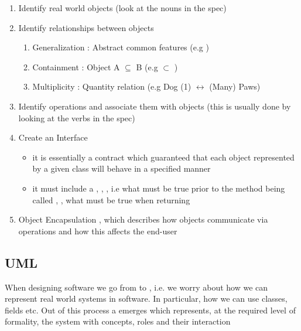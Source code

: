 \begin{enumerate}
	\item Identify real world objects (look at the nouns in the spec)
	\item Identify relationships between objects
		\begin{enumerate}
			\item[] Generalization : Abstract common features (e.g )
			\item[] Containment : Object A $\subseteq$ B (e.g  $\subset$
					)
			\item[] Multiplicity : Quantity relation (e.g Dog (1)
					$\leftrightarrow$ (Many) Paws)
		\end{enumerate}
	\item{Identify operations and associate them with objects (this is usually
		done by looking at the verbs in the spec)}
	\item{Create an Interface}
		\begin{itemize}
			\item[]{it is essentially a contract which guaranteed that each object
					represented by a given class will behave in a specified manner}
			\item[]{it must include a  ,
 ,  , i.e what must be true prior
to the method being called ,  , what must be true when
returning}
		\end{itemize}
		\item{Object Encapsulation , which describes how objects communicate
		via operations and how this affects the end-user} 
\end{enumerate}

\subsection{UML}



	\par{When designing software we go from  to , i.e. we
			worry about how we can represent real world systems in software. In
	particular, how we can use classes, fields etc. Out of this process a
	 emerges which represents, at the required level of
	formality, the system with concepts, roles and their interaction}

